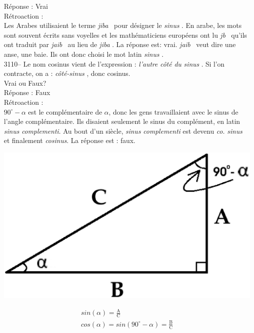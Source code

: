 \documentclass[letterpaper, 12pt]{article}
\begin{document}
R\'eponse : Vrai\\

R\'etroaction :\\
Les Arabes utilisaient le terme \og \emph{jiba} \fg \ pour d\'esigner le \og \emph{sinus} \fg. En arabe, les mots sont souvent \'ecrits sans voyelles et les math\'ematiciens europ\'eens ont lu \og \emph{jb} \fg \ qu'ils ont traduit par \og \emph{jaib} \fg \ au lieu de \og \emph{jiba} \fg. La r\'eponse est: vrai. \og \emph{jaib} \fg \ veut dire une anse, une baie. Ils ont donc choisi le mot latin \og \emph{sinus} \fg.\\



3110-- Le nom cosinus vient de l'expression : \og \emph{l'autre c\^ot\'e du sinus} \fg. Si l'on contracte, on a : \og \emph{c\^ot\'e-sinus} \fg, donc cosinus.\\
Vrai ou Faux?\\

R\'eponse : Faux\\

R\'etroaction :\\
$90^\circ - \alpha$ est le compl\'ementaire de $\alpha$, donc les gens travaillaient avec le sinus de l'angle compl\'ementaire. Ils disaient seulement le sinus du compl\'ement, en latin \emph{sinus complementi}. Au bout d'un si\`ecle, \emph{sinus complementi} est devenu \emph{co. sinus} et finalement \emph{cosinus}. La r\'eponse est : faux.\\
\begin{center}
\includegraphics[scale=0.35]{cosinus.eps}\\
\end{center}
\begin{eqnarray*}
sin(\alpha) = \frac{\textrm{A}}{\textrm{C}}\\[2mm]
cos(\alpha) = sin(90^\circ - \alpha) = \frac{\textrm{B}}{\textrm{C}}\\
\end{eqnarray*}
\end{document}

